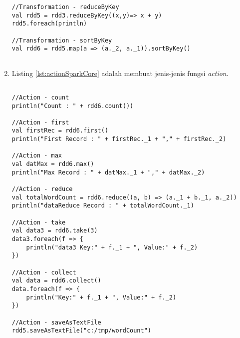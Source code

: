 \begin{enumerate}
\begin{lstlisting}[basicstyle=\ttfamily, frame=single,
	columns=fullflexible, keepspaces=true, breaklines=true, label=lst:transSparkCore, caption=Membuat Fungsi Transformation]
//Transformation - reduceByKey
val rdd5 = rdd3.reduceByKey((x,y)=> x + y)
rdd5.foreach(println)

//Transformation - sortByKey
val rdd6 = rdd5.map(a => (a._2, a._1)).sortByKey()
    
\end{lstlisting}

\newpage
\item Listing \ref{lst:actionSparkCore} adalah membuat jenis-jenis fungsi \textit{action}.
\begin{lstlisting}[basicstyle=\ttfamily, frame=single,
	columns=fullflexible, keepspaces=true, breaklines=true, label=lst:actionSparkCore, caption=Membuat Fungsi Action]

//Action - count
println("Count : " + rdd6.count())

//Action - first
val firstRec = rdd6.first()
println("First Record : " + firstRec._1 + "," + firstRec._2)

//Action - max
val datMax = rdd6.max()
println("Max Record : " + datMax._1 + "," + datMax._2)

//Action - reduce
val totalWordCount = rdd6.reduce((a, b) => (a._1 + b._1, a._2))
println("dataReduce Record : " + totalWordCount._1)

//Action - take
val data3 = rdd6.take(3)
data3.foreach(f => {
	println("data3 Key:" + f._1 + ", Value:" + f._2)
})

//Action - collect
val data = rdd6.collect()
data.foreach(f => {
	println("Key:" + f._1 + ", Value:" + f._2)
})

//Action - saveAsTextFile
rdd5.saveAsTextFile("c:/tmp/wordCount")
	
\end{lstlisting}

\end{enumerate}


